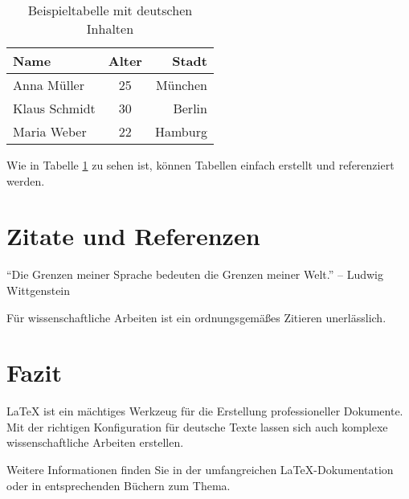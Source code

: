 \documentclass[12pt,a4paper]{article}
\begin{document}
\begin{table}[h!]
\centering
\caption{Beispieltabelle mit deutschen Inhalten}
\begin{tabular}{|l|c|r|}
\hline
\textbf{Name} & \textbf{Alter} & \textbf{Stadt} \\
\hline
Anna Müller & 25 & München \\
Klaus Schmidt & 30 & Berlin \\
Maria Weber & 22 & Hamburg \\
\hline
\end{tabular}
\label{tab:beispiel}
\end{table}

Wie in Tabelle \ref{tab:beispiel} zu sehen ist, können Tabellen einfach erstellt und referenziert werden.

\section{Zitate und Referenzen}

"`Die Grenzen meiner Sprache bedeuten die Grenzen meiner Welt."' -- Ludwig Wittgenstein

Für wissenschaftliche Arbeiten ist ein ordnungsgemäßes Zitieren unerlässlich.

\section{Fazit}

LaTeX ist ein mächtiges Werkzeug für die Erstellung professioneller Dokumente. Mit der richtigen Konfiguration für deutsche Texte lassen sich auch komplexe wissenschaftliche Arbeiten erstellen.

Weitere Informationen finden Sie in der umfangreichen LaTeX-Dokumentation oder in entsprechenden Büchern zum Thema.
\end{document}
